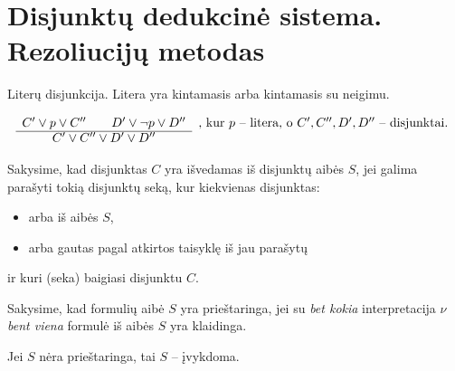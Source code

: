 \chapter{Disjunktų dedukcinė sistema. Rezoliucijų metodas}

\begin{defn}[Disjunktas]
  Literų disjunkcija. Litera yra kintamasis arba kintamasis su neigimu.
\end{defn}

\begin{defn}
  \[
  \begin{array}{c l}
    C' \lor p \lor C'' \qquad D' \lor \neg p \lor D'' &%
      \text{, kur $p$ – litera, o $C',C'',D',D''$ – disjunktai.} \\
    \cline{1-1}
    C' \lor C'' \lor D' \lor D'' &
  \end{array}
  \]
\end{defn}

\begin{defn}[$S \vdash C$]
  Sakysime, kad disjunktas $C$ yra išvedamas iš disjunktų aibės $S$, jei
  galima parašyti tokią disjunktų seką, kur kiekvienas disjunktas:
  \begin{itemize}
    \item arba iš aibės $S$,
    \item arba gautas pagal atkirtos taisyklę iš jau parašytų 
  \end{itemize}
  ir kuri (seka) baigiasi disjunktu $C$.
\end{defn}

\begin{defn}
  Sakysime, kad formulių aibė $S$ yra prieštaringa, jei su \emph{bet kokia}
  interpretacija $\nu$ \emph{bent viena} formulė iš aibės $S$ yra 
  klaidinga.
  \begin{note}
    Jei $S$ nėra prieštaringa, tai $S$ – įvykdoma.
  \end{note}
\end{defn}

